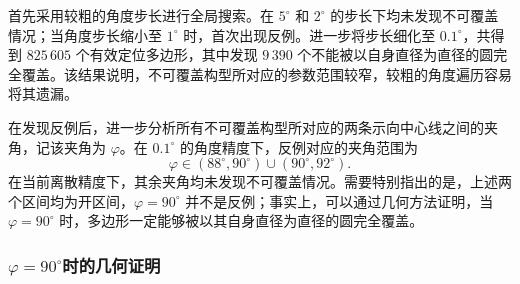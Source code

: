 \documentclass[withoutpreface,bwprint]{cumcmthesis}
\begin{document}
首先采用较粗的角度步长进行全局搜索。在 $5^\circ$ 和 $2^\circ$ 的步长下均未发现不可覆盖情况；当角度步长缩小至 $1^\circ$ 时，首次出现反例。进一步将步长细化至 $0.1^\circ$，共得到 $825\,605$ 个有效定位多边形，其中发现 $9\,390$ 个不能被以自身直径为直径的圆完全覆盖。该结果说明，不可覆盖构型所对应的参数范围较窄，较粗的角度遍历容易将其遗漏。

在发现反例后，进一步分析所有不可覆盖构型所对应的两条示向中心线之间的夹角，记该夹角为 $\varphi$。在 $0.1^\circ$ 的角度精度下，反例对应的夹角范围为
\[
\varphi\in(88^\circ,90^\circ)\cup(90^\circ,92^\circ).
\]
在当前离散精度下，其余夹角均未发现不可覆盖情况。需要特别指出的是，上述两个区间均为开区间，$\varphi=90^\circ$ 并不是反例；事实上，可以通过几何方法证明，当 $\varphi=90^\circ$ 时，多边形一定能够被以其自身直径为直径的圆完全覆盖。
\subsubsection{$\varphi=90^\circ$时的几何证明}
\end{document}
